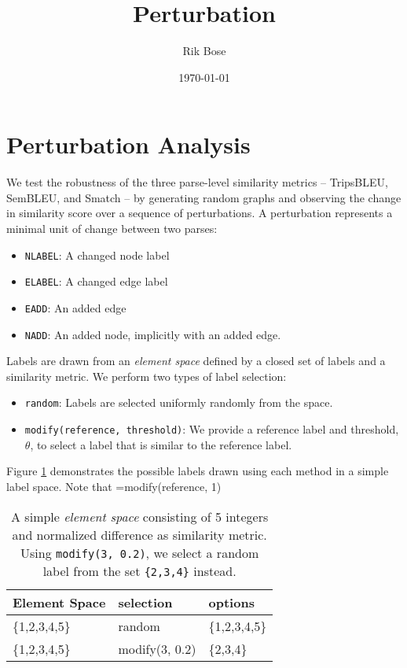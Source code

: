 \documentclass[11pt]{article}
\author{Rik Bose}
\date{\today}
\title{Perturbation}
\begin{document}
\maketitle
\tableofcontents


\section{Perturbation Analysis}
\label{sec:org345e84c}
We test the robustness of the three parse-level similarity metrics -- TripsBLEU, SemBLEU, and Smatch -- by generating random graphs and observing the change in similarity
score over a sequence of perturbations. A perturbation represents a minimal unit of change between two parses:

\begin{itemize}
\item \texttt{NLABEL}: A changed node label
\item \texttt{ELABEL}: A changed edge label
\item \texttt{EADD}: An added edge
\item \texttt{NADD}: An added node, implicitly with an added edge.
\end{itemize}

Labels are drawn from an \emph{element space} defined by a closed set of labels and a similarity metric. We perform two types of label selection:
\begin{itemize}
\item \texttt{random}: Labels are selected uniformly randomly from the space.
\item \texttt{modify(reference, threshold)}: We provide a reference label and threshold, \(\theta\), to select a label that is similar to the reference label.
\end{itemize}
Figure \ref{fig:random-modify} demonstrates the possible labels drawn using each method in a simple label space. Note that =modify(reference, 1)

\begin{table}[htbp]
\centering
\begin{tabular}{lll}
Element Space & selection & options\\
\hline
\{1,2,3,4,5\} & random & \{1,2,3,4,5\}\\
\{1,2,3,4,5\} & modify(3, 0.2) & \{2,3,4\}\\
\end{tabular}
\caption{\label{fig:random-modify}A simple \emph{element space} consisting of 5 integers and normalized difference as similarity metric. Using \texttt{modify(3, 0.2)}, we select a random label from the set \texttt{\{2,3,4\}} instead.}

\end{table}
\end{document}
